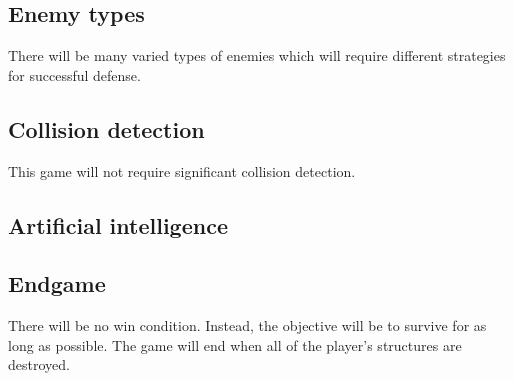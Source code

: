 \documentclass[a4paper,titlepage]{article}
\begin{document}
\subsection{Enemy types}

There will be many varied types of enemies which will require different strategies for successful defense.

\subsection{Collision detection}

This game will not require significant collision detection.

\subsection{Artificial intelligence}

\subsection{Endgame}

There will be no win condition.  Instead, the objective will be to survive for as long as possible.  The game will end when all of the player's structures are destroyed.
\end{document}
